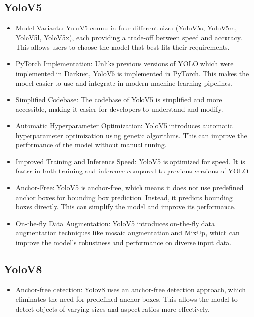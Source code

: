 \subsection{YoloV5}
\begin{itemize}
  \item Model Variants: YoloV5 comes in four different sizes (YoloV5s, YoloV5m, YoloV5l, YoloV5x), each providing a trade-off between speed and accuracy. This allows users to choose the model that best fits their requirements.
  \item PyTorch Implementation: Unlike previous versions of YOLO which were implemented in Darknet, YoloV5 is implemented in PyTorch. This makes the model easier to use and integrate in modern machine learning pipelines.
  \item Simplified Codebase: The codebase of YoloV5 is simplified and more accessible, making it easier for developers to understand and modify.
  \item Automatic Hyperparameter Optimization: YoloV5 introduces automatic hyperparameter optimization using genetic algorithms. This can improve the performance of the model without manual tuning.
  \item Improved Training and Inference Speed: YoloV5 is optimized for speed. It is faster in both training and inference compared to previous versions of YOLO.
  \item Anchor-Free: YoloV5 is anchor-free, which means it does not use predefined anchor boxes for bounding box prediction. Instead, it predicts bounding boxes directly. This can simplify the model and improve its performance.
  \item On-the-fly Data Augmentation: YoloV5 introduces on-the-fly data augmentation techniques like mosaic augmentation and MixUp, which can improve the model's robustness and performance on diverse input data.
\end{itemize}

\subsection{YoloV8}
\begin{itemize}
  \item Anchor-free detection: Yolov8 uses an anchor-free detection approach, which eliminates the need for predefined anchor boxes. This allows the model to detect objects of varying sizes and aspect ratios more effectively.
\end{itemize}

